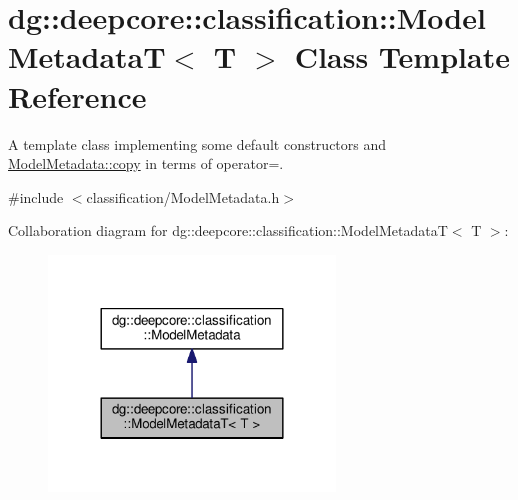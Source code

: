 \hypertarget{classdg_1_1deepcore_1_1classification_1_1_model_metadata_t}{}\section{dg\+:\+:deepcore\+:\+:classification\+:\+:Model\+MetadataT$<$ T $>$ Class Template Reference}
\label{classdg_1_1deepcore_1_1classification_1_1_model_metadata_t}


A template class implementing some default constructors and \hyperlink{group___classification_module_ga851d179b56e5c32b25512df0141f3ca2}{Model\+Metadata\+::copy} in terms of operator=.  




{\ttfamily \#include $<$classification/\+Model\+Metadata.\+h$>$}



Collaboration diagram for dg\+:\+:deepcore\+:\+:classification\+:\+:Model\+MetadataT$<$ T $>$\+:
\nopagebreak
\begin{figure}[H]
\begin{center}
\leavevmode
\includegraphics[width=216pt]{classdg_1_1deepcore_1_1classification_1_1_model_metadata_t__coll__graph}
\end{center}
\end{figure}
